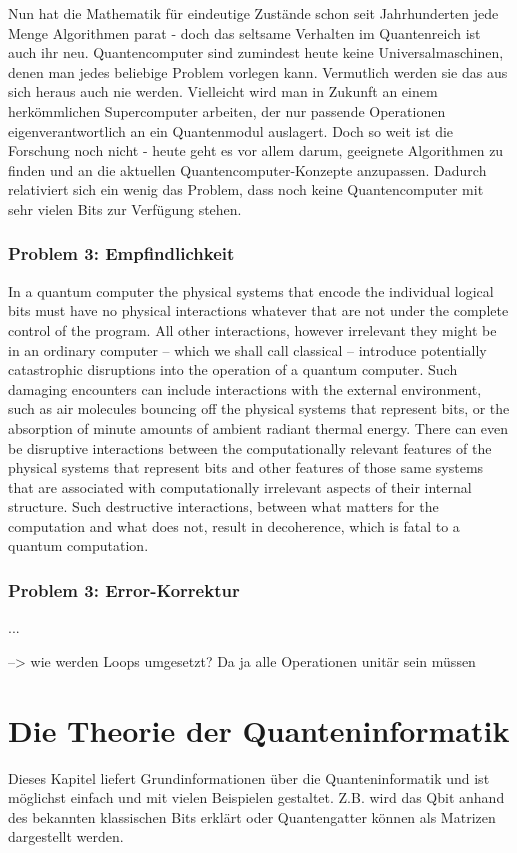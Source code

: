 \documentclass[a4paper,10pt]{scrartcl}
\begin{document}
Nun hat die Mathematik für eindeutige Zustände schon seit Jahrhunderten jede Menge Algorithmen parat - doch das seltsame Verhalten im Quantenreich ist auch ihr neu. Quantencomputer sind zumindest heute keine Universalmaschinen, denen man jedes beliebige Problem vorlegen kann. Vermutlich werden sie das aus sich heraus auch nie werden. Vielleicht wird man in Zukunft an einem herkömmlichen Supercomputer arbeiten, der nur passende Operationen eigenverantwortlich an ein Quantenmodul auslagert. Doch so weit ist die Forschung noch nicht - heute geht es vor allem darum, geeignete Algorithmen zu finden und an die aktuellen Quantencomputer-Konzepte anzupassen. Dadurch relativiert sich ein wenig das Problem, dass noch keine Quantencomputer mit sehr vielen Bits zur Verfügung stehen.

\subsubsection{Problem 3: Empfindlichkeit}
In a quantum computer the physical systems that encode the individual
logical bits must have no physical interactions whatever that are
not under the complete control of the program. All other interactions,
however irrelevant they might be in an ordinary computer – which
we shall call classical – introduce potentially catastrophic disruptions
into the operation of a quantum computer. Such damaging encounters
can include interactions with the external environment, such as
air molecules bouncing off the physical systems that represent bits, or
the absorption of minute amounts of ambient radiant thermal energy.
There can even be disruptive interactions between the computationally
relevant features of the physical systems that represent bits and
other features of those same systems that are associated with computationally
irrelevant aspects of their internal structure. Such destructive
interactions, between what matters for the computation and what does
not, result in decoherence, which is fatal to a quantum computation.

\subsubsection{Problem 3: Error-Korrektur}
...

--> wie werden Loops umgesetzt? Da ja alle Operationen unitär sein müssen

\newpage

\section{Die Theorie der Quanteninformatik}
Dieses Kapitel liefert Grundinformationen über die Quanteninformatik und ist möglichst einfach und mit vielen Beispielen gestaltet. Z.B. wird das Qbit anhand des bekannten klassischen Bits erklärt oder Quantengatter können als Matrizen dargestellt werden. 
\end{document}
